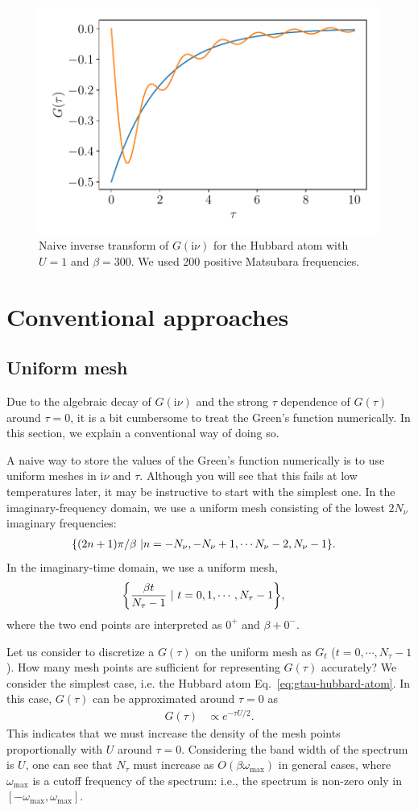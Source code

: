 \documentclass[submission, LectureNotes]{SciPost}
\newcommand{\wmax}{\ensuremath{{\omega_\mathrm{max}}}}
\newcommand\ii{\mathrm{i}}%
\newcommand\iv{\ii\nu}%
\begin{document}
\begin{figure}
    \centering
    \includegraphics[width=0.5\columnwidth]{naive_inverse_transform_hubbard_atom.pdf}
    \caption{Naive inverse transform of $G(\iv)$ for the Hubbard atom with $U=1$ and $\beta=300$. We used 200 positive Matsubara frequencies.}
    \label{fig:naive-inverse-transform-hubbard-atom}
\end{figure}


\clearpage
\section{Conventional approaches}
\subsection{Uniform mesh}
Due to the algebraic decay of $G(\iv)$ and the strong $\tau$ dependence of $G(\tau)$ around $\tau=0$,
it is a bit cumbersome to treat the Green's function numerically.
In this section, we explain a conventional way of doing so.

A naive way to store the values of the Green's function numerically is to use uniform meshes in $\iv$ and $\tau$.
Although you will see that this fails at low temperatures later,
it may be instructive to start with the simplest one.
In the imaginary-frequency domain, we use a uniform mesh consisting of the lowest $2N_\nu$ imaginary frequencies:
\begin{align}
&\qty{(2n+1)\pi/\beta~| n=-N_\nu, -N_\nu+1, \cdots N_\nu-2, N_\nu-1}.
\end{align}
In the imaginary-time domain, we use a uniform mesh,
\begin{align}
&\qty{\frac{\beta t}{N_\tau-1}~|~t=0, 1, \cdots, N_\tau-1},
\end{align}
where the two end points are interpreted as $0^+$ and $\beta + 0^-$.

Let us consider to discretize a $G(\tau)$ on the uniform mesh as $G_t$ ($t=0, \cdots, N_\tau-1$).
How many mesh points are sufficient for representing $G(\tau)$ accurately?
We consider the simplest case, i.e. the Hubbard atom Eq.~\eqref{eq:gtau-hubbard-atom}.
In this case, $G(\tau)$ can be approximated around $\tau=0$ as
\begin{align}
    G(\tau) &\propto e^{-\tau U/2}.
\end{align}
This indicates that we must increase the density of the mesh points proportionally with $U$ around $\tau=0$.
Considering the band width of the spectrum is $U$, one can see that $N_\tau$ must increase as $O(\beta \wmax)$ in general cases,
where $\wmax$ is a cutoff frequency of the spectrum: i.e., the spectrum is non-zero only in $[-\wmax, \wmax]$.
\end{document}
